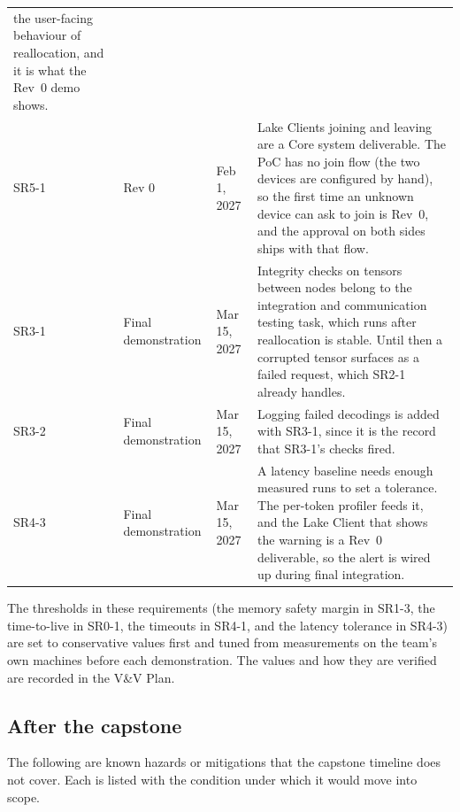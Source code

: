\documentclass{article}
\begin{document}
\begin{longtable}{lp{2.1cm}p{1.9cm}>{\raggedright\arraybackslash}p{8.6cm}}
  the user-facing behaviour of reallocation, and it is what the Rev~0 demo
  shows.\\
SR5-1 & Rev 0 & Feb 1, 2027 & Lake Clients joining and leaving are a
  Core system deliverable. The PoC has no join flow (the two devices are
  configured by hand), so the first time an unknown device can ask to
  join is Rev~0, and the approval on both sides ships with that flow.\\
\midrule
SR3-1 & Final demonstration & Mar 15, 2027 & Integrity checks on tensors
  between nodes belong to the integration and communication testing task,
  which runs after reallocation is stable. Until then a corrupted tensor
  surfaces as a failed request, which SR2-1 already handles.\\
SR3-2 & Final demonstration & Mar 15, 2027 & Logging failed decodings is
  added with SR3-1, since it is the record that SR3-1's checks fired.\\
SR4-3 & Final demonstration & Mar 15, 2027 & A latency baseline needs
  enough measured runs to set a tolerance. The per-token profiler feeds it,
  and the Lake Client that shows the warning is a Rev~0 deliverable, so
  the alert is wired up during final integration.\\
\bottomrule
\end{longtable}

The thresholds in these requirements (the memory safety margin in SR1-3,
the time-to-live in SR0-1, the timeouts in SR4-1, and the latency tolerance
in SR4-3) are set to conservative values first and tuned from measurements
on the team's own machines before each demonstration. The values and how
they are verified are recorded in the V\&V Plan.

\subsection{After the capstone}

The following are known hazards or mitigations that the capstone timeline
does not cover. Each is listed with the condition under which it would move
into scope.
\end{document}
